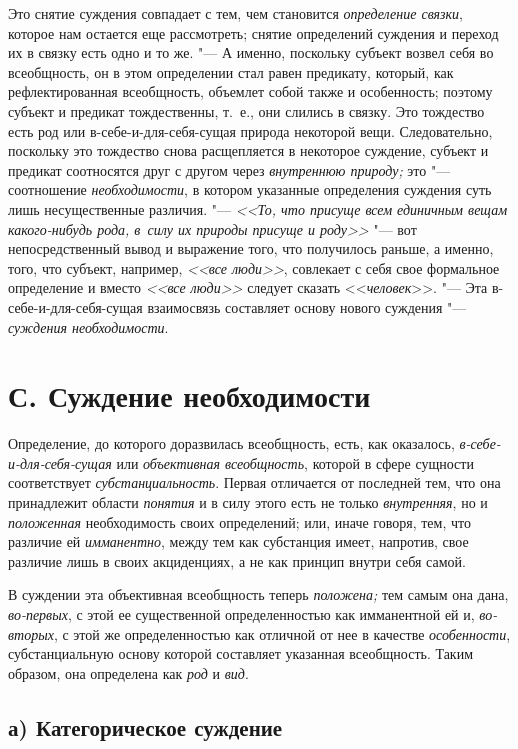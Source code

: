 Это снятие суждения совпадает с тем, чем становится {\em определение связки},
которое нам остается еще рассмотреть; снятие определений суждения и переход их
в связку есть одно и то же. "--- А именно, поскольку субъект возвел себя во
всеобщность, он в этом определении стал равен предикату, который, как
рефлектированная всеобщность, объемлет собой также и особенность; поэтому
субъект и предикат тождественны, т.~е., они слились в связку. Это тождество
есть род или в-себе-и-для-себя-сущая природа некоторой вещи. Следовательно,
поскольку это тождество снова расщепляется в некоторое суждение, субъект и
предикат соотносятся друг с другом через {\em внутреннюю природу;} это "---
соотношение {\em необходимости}, в котором указанные определения суждения суть
лишь несущественные различия. "--- {\em <<То, что присуще всем единичным вещам
какого-нибудь рода, в~силу их природы присуще и роду>>} "--- вот
непосредственный вывод и выражение того, что получилось раньше, а именно, того,
что субъект, например, {\em <<все люди>>}, совлекает с себя свое формальное
определение и вместо {\em <<все люди>>} следует сказать <<{\em человек}>>. "---
Эта в-себе-и-для-себя-сущая взаимосвязь составляет основу нового суждения "---
{\em суждения необходимости}.

\section[С. Суждение необходимости]{С. Суждение необходимости}
Определение, до которого доразвилась всеобщность, есть, как
оказалось, {\em в-себе-и-для-себя-сущая} или {\em объективная
всеобщность}, которой в сфере сущности соответствует {\em субстанциальность}.
Первая отличается от последней тем, что она принадлежит
области {\em понятия} и в силу этого есть не только {\em внутренняя}, но и
{\em положенная} необходимость своих определений; или, иначе говоря, тем, что
различие ей {\em имманентно},
между тем как субстанция имеет, напротив, свое различие лишь
в своих акциденциях, а не как принцип внутри себя самой.

В суждении эта объективная всеобщность теперь {\em положена;} тем самым
она дана, {\em во-первых}, с этой ее существенной определенностью как
имманентной ей и, {\em во-вторых}, с этой
же определенностью как отличной от нее в качестве {\em особенности},
субстанциальную основу которой составляет указанная
всеобщность. Таким образом, она определена как {\em род} и {\em вид}.

\subsection[а) Категорическое суждение]{а) Категорическое суждение}

